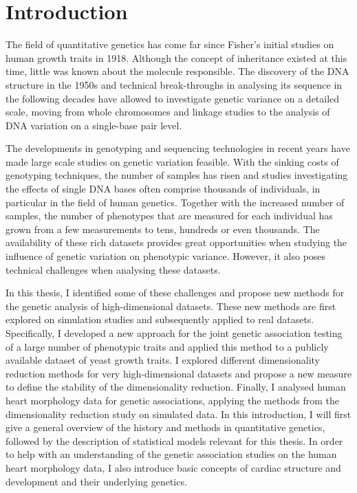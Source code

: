 \chapter{Introduction}
The field of quantitative genetics has come far since Fisher's initial studies on human growth traits in 1918. Although the concept of inheritance existed at this time, little was known about the molecule responsible. The discovery of the DNA structure in the 1950s and technical break-throughs in analysing its sequence in the following decades have allowed to investigate genetic variance on a detailed scale, moving from whole chromosomes and linkage studies to the analysis of DNA variation on a single-base pair level. 

The developments in genotyping and sequencing technologies in recent years have made large scale studies on genetic variation feasible. With the sinking costs of genotyping techniques, the number of samples has risen and studies investigating the effects of single DNA bases often comprise thousands of individuals, in particular in the field of human genetics.  Together with the increased number of samples, the number of phenotypes that are measured for each individual has grown from a few measurements to tens, hundreds or even thousands. The availability of these rich datasets provides great opportunities when studying the influence of genetic variation on phenotypic variance. However, it also poses technical challenges when analysing these datasets. 

In this thesis, I identified some of these challenges and propose new methods for the genetic analysis of high-dimensional datasets. These new methods are first explored on simulation studies and subsequently applied to real datasets. Specifically, I developed a new approach for the joint genetic association testing of a large number of phenotypic traits and applied this method to a publicly available dataset of yeast growth traits. I explored different dimensionality reduction methods for very high-dimensional datasets and propose a new measure to define the stability of the dimensionality reduction. Finally, I analysed human heart morphology data for genetic associations, applying the methods from the dimensionality reduction study on simulated data. In this introduction, I will first give a general overview of the history and methods in quantitative genetics, followed by the description of statistical models relevant for this thesis. In order to help with an understanding of the genetic association studies on the human heart morphology data, I also introduce basic concepts of cardiac structure and development and their underlying genetics. 

